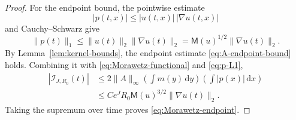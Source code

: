 \documentclass[10pt,a4paper]{amsart}
\newcommand{\M}{\mathsf M}
\newcommand{\dd}{\,\mathrm d}
\begin{document}
\begin{proof}
For the endpoint bound, the pointwise estimate
\[
 |p(t,x)|\le |u(t,x)|\,|\nabla u(t,x)|
\]
and Cauchy--Schwarz give
\begin{equation}\label{eq:p-L1}
 \|p(t)\|_1
 \le\|u(t)\|_2\|\nabla u(t)\|_2
 =\M(u)^{1/2}\|\nabla u(t)\|_2.
\end{equation}
By Lemma~\ref{lem:kernel-bounds}, the endpoint estimate \eqref{eq:A-endpoint-bound} holds. Combining it with \eqref{eq:Morawetz-functional} and \eqref{eq:p-L1},
\begin{align*}
 |\mathcal I_{J,R_0}(t)|
 &\le2\|A\|_\infty
 \left(\int m(y)\dd y\right)
 \left(\int|p(x)|\dd x\right)\\
 &\le Ce^JR_0\M(u)^{3/2}\|\nabla u(t)\|_2.
\end{align*}
Taking the supremum over time proves \eqref{eq:Morawetz-endpoint}.
\end{proof}
\end{document}
